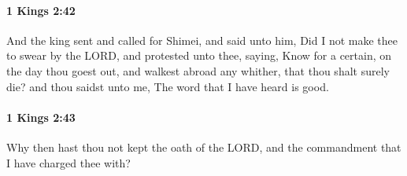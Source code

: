 		\paragraph{1 Kings 2:42} %
			\label{1KINGS-2-42}

			And the king sent and called for Shimei, and said unto him, Did I not make thee to swear by the LORD, and protested unto thee, saying, Know for a certain, on the day thou goest out, and walkest abroad any whither, that thou shalt surely die? and thou saidst unto me, The word that I have heard is good.


		\paragraph{1 Kings 2:43} %
			\label{1KINGS-2-43}

			Why then hast thou not kept the oath of the LORD, and the commandment that I have charged thee with?

